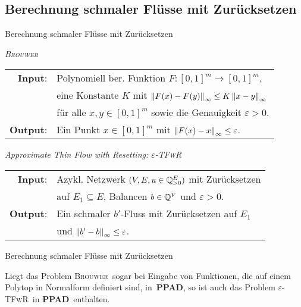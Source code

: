 \subsection{Berechnung schmaler Flüsse mit Zurücksetzen}
\newcommand{\Brouwer}{\textsc{Brouwer}}
\newcommand{\epsTFwR}{\textsc{$\varepsilon$\nobreakdash-TFwR}}
\newcommand{\PPAD}{\textbf{PPAD}}
\begin{frame}{Berechnung schmaler Flüsse mit Zurücksetzen}
	\pause\begin{center}
		\begin{framed}
			\centering
			\emph{\Brouwer} \\[1em]
			\begin{tabular}{rl}
				{\bfseries Input}: &Polynomiell ber. Funktion $F: [0,1]^m \rightarrow [0, 1]^m$,\\
				& eine Konstante $K$ mit $\left\lVert F(x) - F(y)\right\rVert_\infty \leq K \left\lVert x - y\right\rVert_\infty$\\
				&für alle $x,y\in[0,1]^m$ sowie die Genauigkeit $\varepsilon>0$.\\
				{\bfseries Output}: & Ein Punkt $x\in[0,1]^m$ mit $\left\lVert F(x) - x\right\rVert_\infty \leq \varepsilon$.
			\end{tabular}
		\end{framed}
	\end{center}

	\pause\begin{center}
		\begin{framed}
			\centering
			\emph{Approximate Thin Flow with Resetting: \epsTFwR} \\[1em]
			\begin{tabular}{rl}
				{\bfseries Input}: &Azykl. Netzwerk $(V, E, u\in\mathbb{Q}^E_{>0})$ mit Zurücksetzen\\
				&auf $E_1\subseteq E$, Balancen $b\in \mathbb{Q}^V$ und $\varepsilon > 0$.\\
				{\bfseries Output}: &Ein schmaler $b'$-Fluss mit Zurücksetzen auf $E_1$\\ &und $\left\lVert b' - b\right\rVert_\infty \leq \varepsilon$.
			\end{tabular}
		\end{framed}
	\end{center}
\end{frame}

\begin{frame}{Berechnung schmaler Flüsse mit Zurücksetzen}
	\begin{lemma}
		Liegt das Problem \Brouwer\ sogar bei Eingabe von Funktionen, die auf einem Polytop in Normalform definiert sind, in~\PPAD, so ist auch das Problem \epsTFwR\ in \PPAD\ enthalten.
	\end{lemma}
\end{frame}
